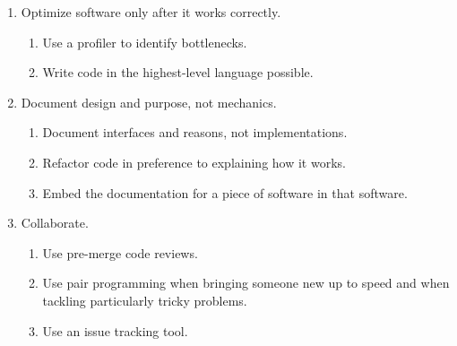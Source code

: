 \documentclass[10pt]{article}
\begin{document}
{\begin{enumerate}
\item Optimize software only after it works correctly.
  \begin{enumerate}
  \item Use a profiler to identify bottlenecks.
  \item Write code in the highest-level language possible.
  \end{enumerate}

\item Document design and purpose, not mechanics.
  \begin{enumerate}
  \item Document interfaces and reasons, not implementations.
  \item Refactor code in preference to explaining how it works.
  \item Embed the documentation for a piece of software in that software.
  \end{enumerate}

\item Collaborate.
  \begin{enumerate}
  \item Use pre-merge code reviews.
  \item Use pair programming when bringing someone new up to speed and when tackling particularly tricky problems.
  \item Use an issue tracking tool.
  \end{enumerate}

\end{enumerate}
}
\end{document}

